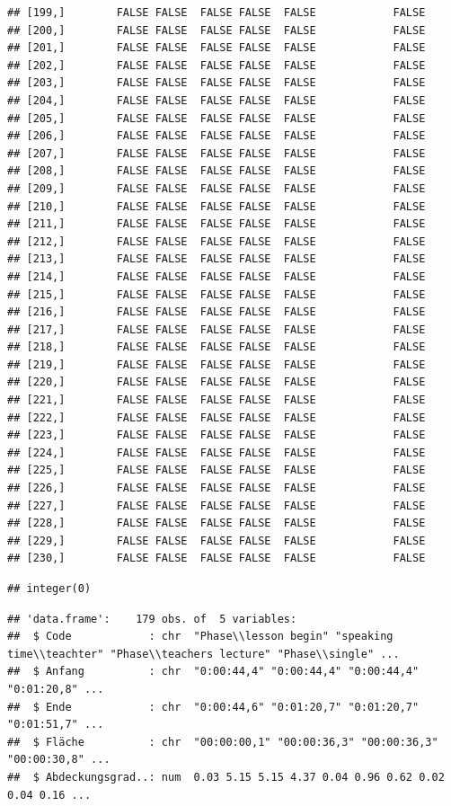 \documentclass[
  english,
  man,floatsintext]{apa6}
\begin{document}
\begin{verbatim}
## [199,]        FALSE FALSE  FALSE FALSE  FALSE            FALSE
## [200,]        FALSE FALSE  FALSE FALSE  FALSE            FALSE
## [201,]        FALSE FALSE  FALSE FALSE  FALSE            FALSE
## [202,]        FALSE FALSE  FALSE FALSE  FALSE            FALSE
## [203,]        FALSE FALSE  FALSE FALSE  FALSE            FALSE
## [204,]        FALSE FALSE  FALSE FALSE  FALSE            FALSE
## [205,]        FALSE FALSE  FALSE FALSE  FALSE            FALSE
## [206,]        FALSE FALSE  FALSE FALSE  FALSE            FALSE
## [207,]        FALSE FALSE  FALSE FALSE  FALSE            FALSE
## [208,]        FALSE FALSE  FALSE FALSE  FALSE            FALSE
## [209,]        FALSE FALSE  FALSE FALSE  FALSE            FALSE
## [210,]        FALSE FALSE  FALSE FALSE  FALSE            FALSE
## [211,]        FALSE FALSE  FALSE FALSE  FALSE            FALSE
## [212,]        FALSE FALSE  FALSE FALSE  FALSE            FALSE
## [213,]        FALSE FALSE  FALSE FALSE  FALSE            FALSE
## [214,]        FALSE FALSE  FALSE FALSE  FALSE            FALSE
## [215,]        FALSE FALSE  FALSE FALSE  FALSE            FALSE
## [216,]        FALSE FALSE  FALSE FALSE  FALSE            FALSE
## [217,]        FALSE FALSE  FALSE FALSE  FALSE            FALSE
## [218,]        FALSE FALSE  FALSE FALSE  FALSE            FALSE
## [219,]        FALSE FALSE  FALSE FALSE  FALSE            FALSE
## [220,]        FALSE FALSE  FALSE FALSE  FALSE            FALSE
## [221,]        FALSE FALSE  FALSE FALSE  FALSE            FALSE
## [222,]        FALSE FALSE  FALSE FALSE  FALSE            FALSE
## [223,]        FALSE FALSE  FALSE FALSE  FALSE            FALSE
## [224,]        FALSE FALSE  FALSE FALSE  FALSE            FALSE
## [225,]        FALSE FALSE  FALSE FALSE  FALSE            FALSE
## [226,]        FALSE FALSE  FALSE FALSE  FALSE            FALSE
## [227,]        FALSE FALSE  FALSE FALSE  FALSE            FALSE
## [228,]        FALSE FALSE  FALSE FALSE  FALSE            FALSE
## [229,]        FALSE FALSE  FALSE FALSE  FALSE            FALSE
## [230,]        FALSE FALSE  FALSE FALSE  FALSE            FALSE
\end{verbatim}

\begin{verbatim}
## integer(0)
\end{verbatim}

\begin{verbatim}
## 'data.frame':    179 obs. of  5 variables:
##  $ Code            : chr  "Phase\\lesson begin" "speaking time\\teachter" "Phase\\teachers lecture" "Phase\\single" ...
##  $ Anfang          : chr  "0:00:44,4" "0:00:44,4" "0:00:44,4" "0:01:20,8" ...
##  $ Ende            : chr  "0:00:44,6" "0:01:20,7" "0:01:20,7" "0:01:51,7" ...
##  $ Fläche          : chr  "00:00:00,1" "00:00:36,3" "00:00:36,3" "00:00:30,8" ...
##  $ Abdeckungsgrad..: num  0.03 5.15 5.15 4.37 0.04 0.96 0.62 0.02 0.04 0.16 ...
\end{verbatim}
\end{document}
